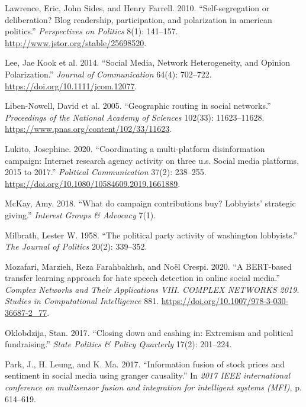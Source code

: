\documentclass[12pt,]{article}
\begin{document}
\begin{CSLReferences}{1}{0}
{\leavevmode{}%
Lawrence, Eric, John Sides, and Henry Farrell. 2010. {``Self-segregation
or deliberation? Blog readership, participation, and polarization in
american politics.''} \emph{Perspectives on Politics} 8(1): 141--157.
\url{http://www.jstor.org/stable/25698520}.

\leavevmode{}%
Lee, Jae Kook et al. 2014. {``{Social Media, Network Heterogeneity, and
Opinion Polarization}.''} \emph{Journal of Communication} 64(4):
702--722. \url{https://doi.org/10.1111/jcom.12077}.

\leavevmode{}%
Liben-Nowell, David et al. 2005. {``Geographic routing in social
networks.''} \emph{Proceedings of the National Academy of Sciences}
102(33): 11623--11628. \url{https://www.pnas.org/content/102/33/11623}.

\leavevmode{}%
Lukito, Josephine. 2020. {``Coordinating a multi-platform disinformation
campaign: Internet research agency activity on three u.s. Social media
platforms, 2015 to 2017.''} \emph{Political Communication} 37(2):
238--255. \url{https://doi.org/10.1080/10584609.2019.1661889}.

\leavevmode{}%
McKay, Amy. 2018. {``What do campaign contributions buy? Lobbyists'
strategic giving.''} \emph{Interest Groups \& Advocacy} 7(1).

\leavevmode{}%
Milbrath, Lester W. 1958. {``The political party activity of washington
lobbyists.''} \emph{The Journal of Politics} 20(2): 339--352.

\leavevmode{}%
Mozafari, Marzieh, Reza Farahbakhsh, and Noël Crespi. 2020. {``A
BERT-based transfer learning approach for hate speech detection in
online social media.''} \emph{Complex Networks and Their Applications
VIII. COMPLEX NETWORKS 2019. Studies in Computational Intelligence} 881.
\url{https://doi.org/10.1007/978-3-030-36687-2_77}.

\leavevmode{}%
Oklobdzija, Stan. 2017. {``Closing down and cashing in: Extremism and
political fundraising.''} \emph{State Politics \& Policy Quarterly}
17(2): 201--224.

\leavevmode{}%
Park, J., H. Leung, and K. Ma. 2017. {``Information fusion of stock
prices and sentiment in social media using granger causality.''} In
\emph{2017 IEEE international conference on multisensor fusion and
integration for intelligent systems (MFI)}, p. 614--619.

}
\end{CSLReferences}
\end{document}
